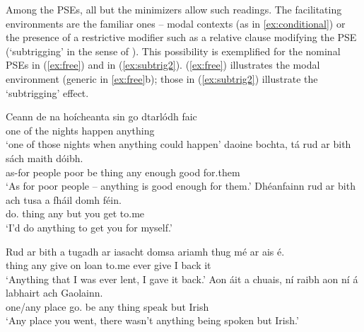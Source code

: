 \documentclass[output=paper,colorlinks,citecolor=brown]{langscibook}
\begin{document}
Among the PSEs, all but the minimizers allow such readings.  The facilitating environments are the familiar ones -- modal contexts (as in \ref{ex:conditional}) or the presence of a restrictive modifier such as a relative clause modifying the PSE (`subtrigging' in the sense of \cite{legrand:75}).  This possibility is exemplified for the nominal PSEs in (\ref{ex:free}) and in (\ref{ex:subtrig2}). (\ref{ex:free}) illustrates the modal environment (generic in \ref{ex:free}b); those in (\ref{ex:subtrig2}) illustrate the `subtrigging' effect.

\ea\label{ex:free}
\ea
\gll Ceann de na hoícheanta sin go dtarlódh faic\\
     one  of the nights {\seo} {\C} {happen\cond} anything\\
\glt `one of those nights when anything could happen'
\ex
{} daoine bochta, tá rud {ar bith} sách maith dóibh.\\
     {as-for} people poor {be\pres} thing any enough good {for.them}\\
\glt `As for poor people -- anything is good enough for them.'
\ex
\gll Dhéanfainn rud {ar bith} ach tusa a fháil domh féin. \\
     {do\cond.\my} thing any  but you {\vce} {get\vn} to.me {\fein} \\
\glt `I'd do anything to get you for myself.'
\z
\z


\ea\label{ex:subtrig2}
\ea
\gll Rud {ar bith} a tugadh ar iasacht domsa ariamh    thug mé {ar ais} é. \\
    thing any {\C} {give\past\imp} on loan to.me ever {give\past} I back it \\
\glt `Anything that I was ever lent, I gave it back.'
\ex
\gll Aon áit a chuais, ní raibh aon ní á labhairt ach Gaolainn. \\
     {one/any} place {\C} {go\past.\your} {\nior} {be\past} any thing {\progpass} {speak} but Irish \\
\glt `Any place you went, there wasn't anything being spoken but Irish.'\\\hfill{}
\z
\z
\end{document}
